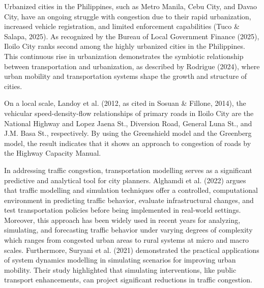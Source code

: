 Urbanized cities in the Philippines, such as Metro Manila, Cebu City, and Davao City, have an ongoing struggle with congestion due to their rapid urbanization, increased vehicle registration, and limited enforcement capabilities (Tuco \& Salapa, 2025). As recognized by the Bureau of Local Government Finance (2025), Iloilo City ranks second among the highly urbanized cities in the Philippines. This continuous rise in urbanization demonstrates the symbiotic relationship between transportation and urbanization, as described by Rodrigue (2024), where urban mobility and transportation systems shape the growth and structure of cities.

On a local scale, Landoy et al. (2012, as cited in Sosuan \& Fillone, 2014), the vehicular speed-density-flow relationships of primary roads in Iloilo City are the National Highway and Lopez Jaena St., Diversion Road, General Luna St., and J.M. Basa St., respectively. By using the Greenshield model and the Greenberg model, the result indicates that it shows an approach to congestion of roads by the Highway Capacity Manual.

In addressing traffic congestion, transportation modelling serves as a significant predictive and analytical tool for city planners. Alghamdi et al. (2022) argues that traffic modelling and simulation techniques offer a controlled, computational environment in predicting traffic behavior, evaluate infrastructural changes, and test transportation policies before being implemented in real-world settings. Moreover, this approach has been widely used in recent years for analyzing, simulating, and forecasting traffic behavior under varying degrees of complexity which ranges from congested urban areas to rural systems at micro and macro scales. Furthermore, Suryani et al. (2021) demonstrated the practical applications of system dynamics modelling in simulating scenarios for improving urban mobility. Their study highlighted that simulating interventions, like public transport enhancements, can project significant reductions in traffic congestion.



